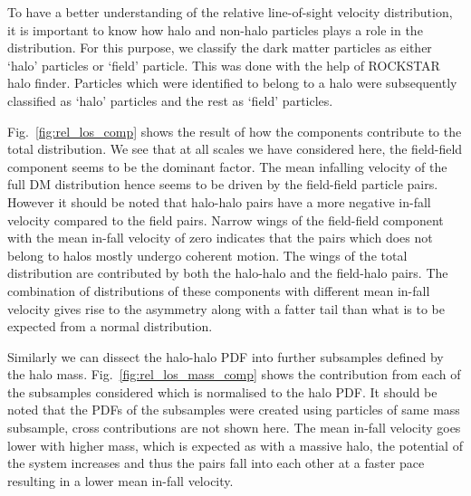 \documentclass[a4paper,fleqn,usenatbib]{mnras}
\begin{document}
	To have a better understanding of the relative line-of-sight velocity distribution, it is important to know how halo and non-halo particles plays a role in the distribution. For this purpose, we classify the dark matter particles as either `halo' particles or `field' particle. This was done with the help of ROCKSTAR halo finder. Particles which were identified to belong to a halo were subsequently classified as `halo' particles and the rest as `field' particles.  
	
	Fig.~\ref{fig:rel_los_comp} shows the result of how the components contribute to the total distribution. We see that at all scales we have considered here, the field-field component seems to be the dominant factor. The mean infalling velocity of the full DM distribution hence seems to be driven by the field-field particle pairs. However it should be noted that halo-halo pairs have a more negative in-fall velocity compared to the field pairs.  Narrow wings of the field-field component with the mean in-fall velocity of zero indicates that the pairs  which does not belong to halos mostly undergo coherent motion. The wings of the total distribution are contributed by both the halo-halo and the field-halo pairs. The combination of distributions of these components with different mean in-fall velocity gives rise to the asymmetry along with a fatter tail than what is to be expected from a normal distribution. 
	
	Similarly we can dissect the halo-halo PDF into further subsamples defined by the halo mass. Fig.~\ref{fig:rel_los_mass_comp} shows the contribution from each of the subsamples considered which is normalised to the halo PDF. It should be noted that the PDFs of the subsamples were created using particles of same mass subsample, cross contributions are not shown here. The mean in-fall velocity goes lower with higher mass, which is expected as with a massive halo, the potential of the system increases and thus the pairs fall into each other at a faster pace resulting in a lower mean in-fall velocity.
	
\end{document}
